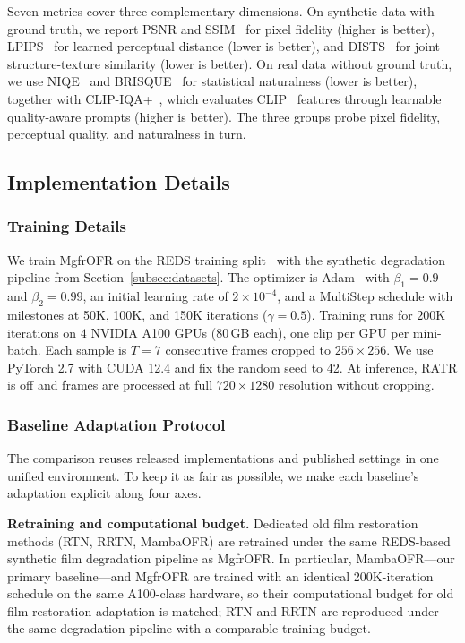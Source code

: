 Seven metrics cover three complementary dimensions. On synthetic data with ground truth, we report PSNR and SSIM~\cite{wang2004ssim} for pixel fidelity (higher is better), LPIPS~\cite{zhang2018lpips} for learned perceptual distance (lower is better), and DISTS~\cite{ding2020dists} for joint structure-texture similarity (lower is better). On real data without ground truth, we use NIQE~\cite{mittal2012niqe} and BRISQUE~\cite{mittal2012brisque} for statistical naturalness (lower is better), together with CLIP-IQA+~\cite{wang2023clipiqa}, which evaluates CLIP~\cite{radford2021clip} features through learnable quality-aware prompts (higher is better). The three groups probe pixel fidelity, perceptual quality, and naturalness in turn.

\subsection{Implementation Details}
\label{subsec:implementation}

\subsubsection{Training Details}
\label{subsubsec:training_details}

We train MgfrOFR on the REDS training split~\cite{nah2019reds} with the synthetic degradation pipeline from Section~\ref{subsec:datasets}. The optimizer is Adam~\cite{kingma2015adam} with $\beta_1=0.9$ and $\beta_2=0.99$, an initial learning rate of $2\times10^{-4}$, and a MultiStep schedule with milestones at 50K, 100K, and 150K iterations ($\gamma=0.5$). Training runs for $200$K iterations on $4$ NVIDIA A100 GPUs (80\,GB each), one clip per GPU per mini-batch. Each sample is $T=7$ consecutive frames cropped to $256\times256$. We use PyTorch 2.7 with CUDA 12.4 and fix the random seed to 42. At inference, RATR is off and frames are processed at full $720 \times 1280$ resolution without cropping.

\subsubsection{Baseline Adaptation Protocol}
\label{subsubsec:baseline_adaptation}

The comparison reuses released implementations and published settings in one unified environment. To keep it as fair as possible, we make each baseline's adaptation explicit along four axes.

\textbf{Retraining and computational budget.} Dedicated old film restoration methods (RTN, RRTN, MambaOFR) are retrained under the same REDS-based synthetic film degradation pipeline as MgfrOFR. In particular, MambaOFR---our primary baseline---and MgfrOFR are trained with an identical 200K-iteration schedule on the same A100-class hardware, so their computational budget for old film restoration adaptation is matched; RTN and RRTN are reproduced under the same degradation pipeline with a comparable training budget.

